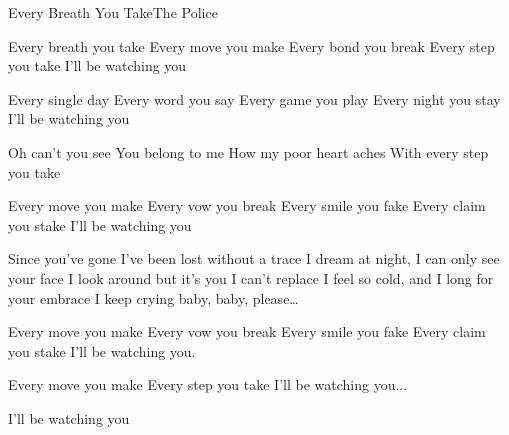 \documentclass[a4paper,11pt,french]{article}
\begin{document}

\begin{Song}{Every Breath You Take}{The Police}
\begin{multicols}{2}

\begin{Verse}
Every breath you take
Every move you make
Every bond you break
Every step you take
I'll be watching you
\espaceInterStrophe

Every single day
Every word you say
Every game you play
Every night you stay
I'll be watching you
\end{Verse}
\espaceInterStrophe

\begin{Chorus}
Oh can't you see
You belong to me
How my poor heart aches
With every step you take
\end{Chorus}
\espaceInterStrophe

\begin{Verse}
Every move you make
Every vow you break
Every smile you fake
Every claim you stake
I'll be watching you
\end{Verse}
\columnbreak

\begin{Bridge}
Since you've gone I've been lost without a trace
I dream at night, I can only see your face
I look around but it's you I can't replace
I feel so cold, and I long for your embrace
I keep crying baby, baby, please\dots
\end{Bridge}
\espaceInterStrophe

\tochorus
\espaceInterStrophe

\begin{Verse}
Every move you make
Every vow you break
Every smile you fake
Every claim you stake
I'll be watching you.
\espaceInterStrophe

Every move you make
Every step you take
I'll be watching you...
\espaceInterStrophe

I'll be watching you
\end{Verse}
\vfill
~

\end{multicols}

\vfill

\begin{multicols}{2}

\gridGroupNormal

\begin{Chords}
\hline
\\\hline
\end{Chords}
\espaceInterGrille


\begin{Chords}
\hline
\\\hline
\end{Chords}

\end{multicols}

\vfill

\end{Song}
\end{document}
